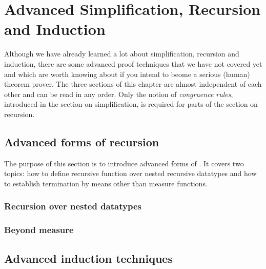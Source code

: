 \chapter{Advanced Simplification, Recursion and Induction}

Although we have already learned a lot about simplification, recursion and
induction, there are some advanced proof techniques that we have not covered
yet and which are worth knowing about if you intend to beome a serious
(human) theorem prover. The three sections of this chapter are almost
independent of each other and can be read in any order. Only the notion of
\emph{congruence rules}, introduced in the section on simplification, is
required for parts of the section on recursion.



\section{Advanced forms of recursion}

The purpose of this section is to introduce advanced forms of . It
covers two topics: how to define recursive function over nested recursive datatypes
and how to establish termination by means other than measure functions.

\subsection{Recursion over nested datatypes}
\label{sec:nested-recdef}




\subsection{Beyond measure}
\label{sec:wellfounded}


\section{Advanced induction techniques}
\label{sec:advanced-ind}

